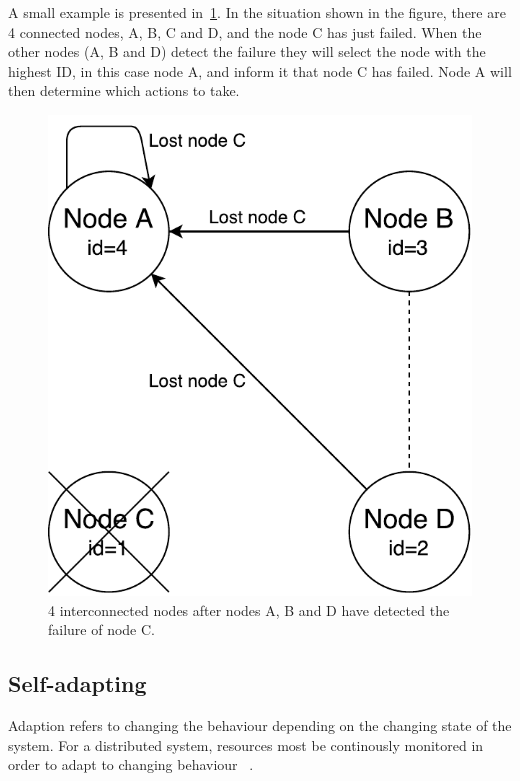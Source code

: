 \documentclass{cslthse-msc}
\begin{document}
A small example is presented in~\cref{fig:handling_node_failure}. In the situation shown in the figure, there are 4 connected nodes, A, B, C and D, and the node C has just failed. When the other nodes (A, B and D) detect the failure they will select the node with the highest ID, in this case node A, and inform it that node C has failed. Node A will then determine which actions to take.

\begin{figure}[!hbt]
\centering
\includegraphics[scale=0.5]{images/handling_node_failure.pdf}
\caption{4 interconnected nodes after nodes A, B and D have detected the failure of node C.}\label{fig:handling_node_failure}
\end{figure}

\subsection{Self-adapting} \label{subsec:design_self_adapting}
Adaption refers to changing the behaviour depending on the changing state of the system. For a distributed system, resources most be continously monitored in order to adapt to changing behaviour ~\cite{imprRelAdaptRL}.
\end{document}

